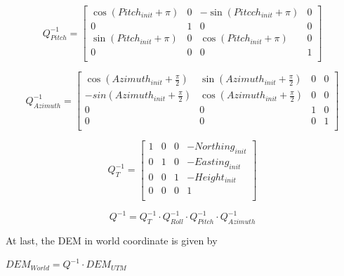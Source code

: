 \begin{equation}
Q_{Pitch}^{-1}=\begin{bmatrix}
\cos (Pitch_{init}+\pi ) & 0 & -\sin (Pitcch_{init}+\pi ) & 0 \\
0 & 1 & 0 & 0 \\
\sin (Pitch_{init}+\pi ) & 0 & \cos (Pitch_{init}+\pi ) & 0 \\
0 & 0 & 0 & 1 \\
\end{bmatrix}
\end{equation}

\begin{equation}
Q_{Azimuth}^{-1}=\begin{bmatrix}
\cos (Azimuth_{init}+\frac{\pi }{2}) & \sin (Azimuth_{init}+\frac{\pi 
}{2}) & 0 & 0\\
-sin(Azimuth_{init}+\frac{\pi }{2}) & \cos (Azimuth_{init}+\frac{\pi 
}{2}) & 0 & 0 \\
0 & 0 & 1 & 0 \\
0 & 0 & 0 & 1 \\
\end{bmatrix}
\end{equation}


\begin{equation}
Q_{T}^{-1}=\begin{bmatrix}
1 & 0 & 0 & -Northing_{init} \\
0 & 1 & 0 & -Easting_{init} \\
0 & 0 & 1 & -Height_{init} \\
0 & 0 & 0 & 1 \\
\end{bmatrix}
\end{equation}

\begin{equation}
Q^{-1}=Q_{T}^{-1}\cdot Q_{Roll}^{-1}\cdot Q_{Pitch}^{-1}\cdot Q_{Azimuth}^{-1}
\end{equation}

At last, the DEM in world coordinate is given by

$DEM_{World}=Q^{-1}\cdot DEM_{UTM}$



